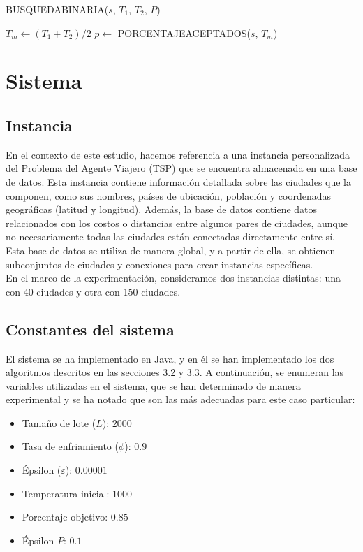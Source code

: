 \documentclass[spanish,12pt,letterpaper]{article}
\begin{document}
	\begin{algorithm}
		\caption{BUSQUEDABINARIA($s$, $T_1$, $T_2$, $P$)}
		$T_m \leftarrow (T_1 + T_2)/2$\;
		$p \leftarrow$ PORCENTAJEACEPTADOS($s$, $T_m$)\;
	\end{algorithm}
	
	\newpage
	\section{Sistema}
	\subsection{Instancia}
	En el contexto de este estudio, hacemos referencia a una instancia personalizada del Problema del Agente Viajero (TSP) que se encuentra almacenada en una base de datos. Esta instancia contiene información detallada sobre las ciudades que la componen, como sus nombres, países de ubicación, población y coordenadas geográficas (latitud y longitud). Además, la base de datos contiene datos relacionados con los costos o distancias entre algunos pares de ciudades, aunque no necesariamente todas las ciudades están conectadas directamente entre sí. Esta base de datos se utiliza de manera global, y a partir de ella, se obtienen subconjuntos de ciudades y conexiones para crear instancias específicas.
	\\
	
	En el marco de la experimentación, consideramos dos instancias distintas: una con 40 ciudades y otra con 150 ciudades.
	
	
	\subsection{Constantes del sistema}
	El sistema se ha implementado en Java, y en él se han implementado los dos algoritmos descritos en las secciones 3.2 y 3.3. A continuación, se enumeran las variables utilizadas en el sistema, que se han determinado de manera experimental y se ha notado que son las más adecuadas para este caso particular:
	
	\begin{itemize}
		\item Tamaño de lote ($L$): $2000$
		\item Tasa de enfriamiento ($\phi$): $0.9$
		\item Épsilon ($\varepsilon$): $0.00001$
		\item Temperatura inicial: $1000$
		\item Porcentaje objetivo: $0.85$
		\item Épsilon $P$: $0.1$
	\end{itemize}
	
\end{document}
